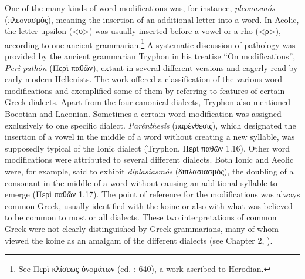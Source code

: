 One of the many kinds of word modifications was, for instance, \textit{pleonasmós} (πλεoνασμός), meaning the insertion of an additional letter into a word. In Aeolic, the letter upsilon (<υ>) was usually inserted before a vowel or a rho (<ρ>), according to one ancient grammarian.\footnote{{See Περὶ κλίσεως ὀνoμάτων (ed. \citealt{Lentz1870}: 640), a work ascribed to Herodian.}} A systematic discussion of pathology was provided by the ancient grammarian Tryphon in his treatise “On modifications”, \textit{Perì pathôn} (Περὶ παθῶν), extant in several different versions and eagerly read by early modern Hellenists. The work offered a classification of the various word modifications and exemplified some of them by referring to features of certain Greek dialects. Apart from the four canonical dialects, Tryphon also mentioned Boeotian and Laconian. Sometimes a certain word modification was assigned exclusively to one specific dialect. \textit{Parénthesis} (παρένθεσις), which designated the insertion of a vowel in the middle of a word without creating a new syllable, was supposedly typical of the Ionic dialect (Tryphon, Περὶ παθῶν 1.16). Other word modifications were attributed to several different dialects. Both Ionic and Aeolic were, for example, said to exhibit \textit{diplasiasmós} (διπλασιασμός), the doubling of a consonant in the middle of a word without causing an additional syllable to emerge (Περὶ παθῶν 1.17). The point of reference for the modifications was always common Greek, usually identified with the koine or also with what was believed to be common to most or all dialects. These two interpretations of common Greek were not clearly distinguished by Greek grammarians, many of whom viewed the koine as an amalgam of the different dialects (see Chapter 2, ).




